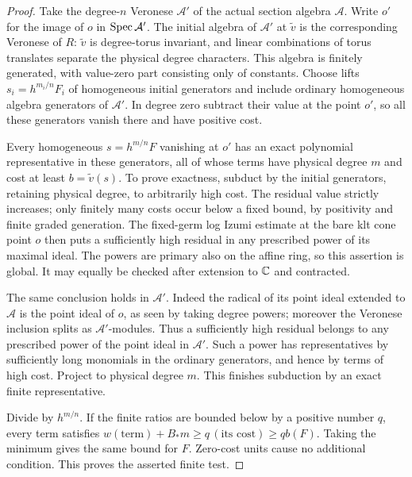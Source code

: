 \begin{proof}
Take the degree-\(n\) Veronese \(\mathcal A'\) of the actual section
algebra \(\mathcal A\).  Write \(o'\) for the image of \(o\) in
\(\operatorname{Spec}\mathcal A'\).  The initial algebra of \(\mathcal A'\)
at \(\widetilde v\) is the corresponding Veronese of \(R\):
\(\widetilde v\) is degree-torus invariant, and linear combinations
of torus translates separate the physical degree characters.
This algebra is finitely generated, with value-zero part consisting
only of constants.  Choose lifts
\(s_i=h^{m_i/n}F_i\) of homogeneous initial generators and include
ordinary homogeneous algebra generators of \(\mathcal A'\).
In degree zero subtract their value at the point \(o'\), so all
these generators vanish there and have positive cost.

Every homogeneous \(s=h^{m/n}F\) vanishing at \(o'\) has an exact
polynomial representative in these generators, all of whose terms
have physical degree \(m\) and cost at least
\(b=\widetilde v(s)\).  To prove exactness, subduct by the initial
generators, retaining physical degree, to arbitrarily high cost.
The residual value strictly increases; only finitely many costs
occur below a fixed bound, by positivity and finite graded
generation.  The fixed-germ log Izumi estimate at the bare klt
cone point \(o\) then puts a sufficiently high residual in any
prescribed power of its maximal ideal.  The powers are primary
also on the affine ring, so this assertion is global.  It may
equally be checked after extension to \(\mathbb C\) and contracted.

The same conclusion holds in \(\mathcal A'\).  Indeed the radical
of its point ideal extended to \(\mathcal A\) is the point ideal
of \(o\), as seen by taking degree powers; moreover the Veronese
inclusion splits as \(\mathcal A'\)-modules.  Thus a sufficiently
high residual belongs to any prescribed power of the point ideal
in \(\mathcal A'\).  Such a power has representatives by
sufficiently long monomials in the ordinary generators, and hence
by terms of high cost.  Project to physical degree \(m\).
This finishes subduction by an exact finite representative.

Divide by \(h^{m/n}\).  If the finite ratios are bounded below
by a positive number \(q\), every term satisfies
\(w(\text{term})+B_*m\ge q\,(\text{its cost})\ge qb(F)\).
Taking the minimum gives the same bound for \(F\).
Zero-cost units cause no additional condition.  This proves the
asserted finite test.
\end{proof}

